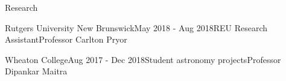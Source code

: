 \documentclass{resume} %
\begin{document}
\begin{rSection}{Research}
\begin{rSubsection}{Rutgers University New Brunswick}{May 2018 - Aug 2018}{REU Research Assistant}{Professor Carlton Pryor}
\end{rSubsection}


\begin{rSubsection}{Wheaton College}{Aug 2017 - Dec 2018}{Student astronomy projects}{Professor Dipankar Maitra}
\end{rSubsection}


\end{rSection}
\end{document}
